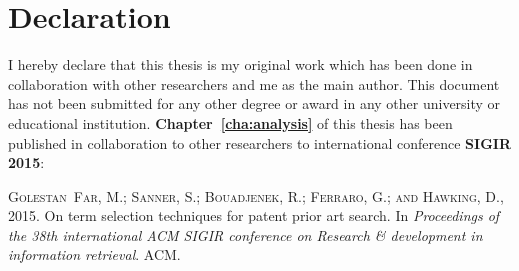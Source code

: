 \chapter*{Declaration}
\vspace{-1em}
I hereby declare that this thesis is my original work which has been done in 
collaboration with other researchers and me as the main author. This document has
not been submitted for any other degree or award in any other university or educational 
institution. \textbf{Chapter~\ref{cha:analysis}} of this thesis has been published in collaboration to other
researchers to international conference \textbf{SIGIR 2015}:
\begin{itemize}
\textsc{Golestan~Far, M.; Sanner, S.; Bouadjenek, R.; Ferraro, G.; and Hawking,
  D.}, 2015.
\newblock On term selection techniques for patent prior art search.
\newblock In \emph{Proceedings of the 38th international ACM SIGIR conference
  on Research \& development in information retrieval}. ACM.

\end{itemize}


